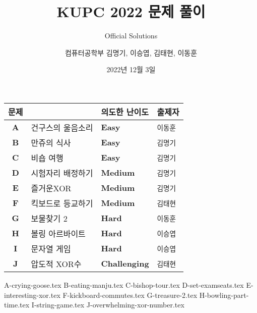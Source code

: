 
\usetikzlibrary{arrows.meta,matrix,decorations.pathreplacing}

\title{KUPC 2022 문제 풀이}
\subtitle{Official Solutions}
\author{컴퓨터공학부 김명기, 이승엽, 김태현, 이동훈}
\date{2022년 12월 3일}


    \setcounter{framenumber}{-1}
    \frame{\titlepage}
        
    \begin{frame} %
        \begin{center}
            \begin{tabular}{cl|l|l}
                \hline
                문제 & & 의도한 난이도 & 출제자 \\
                \hline
                \hline

				\textbf{A} & 건구스의 울음소리 & \textbf{\color{acbronze}Easy} & \texttt{이동훈} \\
                \textbf{B} & 만쥬의 식사& \textbf{\color{acbronze}Easy} & \texttt{김명기} \\
                \textbf{C} & 비숍 여행 & \textbf{\color{acbronze}Easy} & \texttt{김명기} \\
                \textbf{D} & 시험자리 배정하기 & \textbf{\color{acsilver}Medium} & \texttt{김명기} \\
                \textbf{E} & 즐거운XOR & \textbf{\color{acsilver}Medium} & \texttt{김명기} \\
                \textbf{F} & 킥보드로 등교하기 & \textbf{\color{acsilver}Medium} & \texttt{김태현} \\
                \textbf{G} & 보물찾기 2 & \textbf{\color{acgold}Hard} & \texttt{이동훈} \\
                \textbf{H} & 볼링 아르바이트 & \textbf{\color{acgold}Hard} & \texttt{이승엽} \\
                \textbf{I} & 문자열 게임 & \textbf{\color{acgold}Hard} & \texttt{이승엽} \\
                \textbf{J} & 압도적 XOR수 & \textbf{\color{acgold}Challenging} & \texttt{김태현} \\

                \hline
            \end{tabular}
        \end{center}
    \end{frame}
    {A-crying-goose.tex}
    {B-eating-manju.tex}
    {C-bishop-tour.tex}
    {D-set-examseats.tex}
    {E-interesting-xor.tex}
    {F-kickboard-commutes.tex}
    {G-treasure-2.tex}
    {H-bowling-part-time.tex}
    {I-string-game.tex}
    {J-overwhelming-xor-number.tex}


